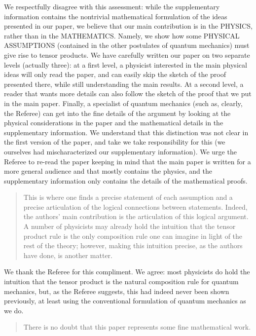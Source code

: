 \documentclass[11pt]{article}
\begin{document}
We respectfully disagree with this assessment: while the supplementary
information contains the nontrivial mathematical formulation of the
ideas presented in our paper, we believe that our main contribution is
in the PHYSICS, rather than in the MATHEMATICS. Namely, we show how
some PHYSICAL ASSUMPTIONS (contained in the other postulates of
quantum mechanics) must give rise to tensor products. We have
carefully written our paper on two separate levels (actually three):
at a first level, a physicist interested in the main physical ideas
will only read the paper, and can easily skip the sketch of the proof
presented there, while still understanding the main results. At a
second level, a reader that wants more details can also follow the
sketch of the proof that we put in the main paper. Finally, a
specialist of quantum mechanics (such as, clearly, the Referee) can
get into the fine details of the argument by looking at the physical
considerations in the paper and the mathematical details in the
supplementary information. We understand that this distinction was not
clear in the first version of the paper, and take we take
responsibility for this (we ourselves had mischaracterized our
supplementary information). We urge the Referee to re-read the paper
keeping in mind that the main paper is written for a more general
audience and that mostly contains the physics, and the supplementary
information only contains the details of the mathematical proofs.
\begin{quote}
This is where one finds a precise statement of each
assumption and a precise articulation of the logical connections
between statements. Indeed, the authors' main contribution is the
articulation of this logical argument. A number of physicists may
already hold the intuition that the tensor product rule is the only
composition rule one can imagine in light of the rest of the theory;
however, making this intuition precise, as the authors have done, is
another matter.\end{quote}

We thank the Referee for this compliment. We agree: most physicists do
hold the intuition that the tensor product is the natural composition
rule for quantum mechanics, but, as the Referee suggests, this had
indeed never been shown previously, at least using the conventional
formulation of quantum mechanics as we do.

\begin{quote}There is no doubt that this paper represents some fine
mathematical work.\end{quote}
\end{document}
